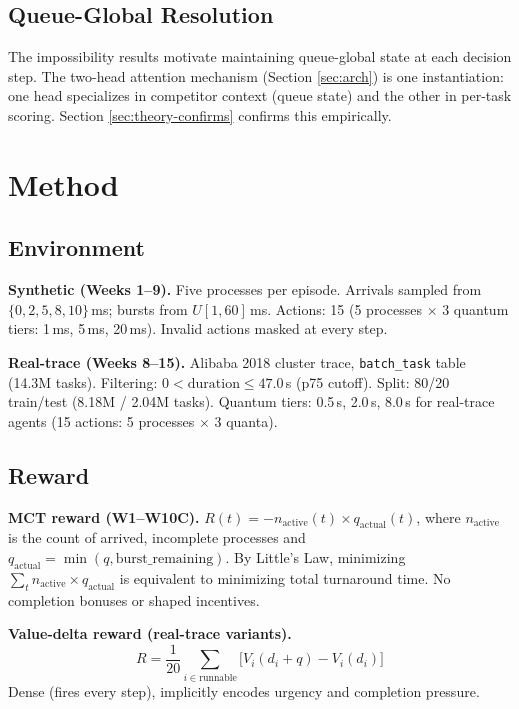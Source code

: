 \documentclass[10pt,twocolumn]{article}
\theoremstyle{remark}
\begin{document}
\subsection{Queue-Global Resolution}

The impossibility results motivate maintaining queue-global state at
each decision step. The two-head attention mechanism (Section
\ref{sec:arch}) is one instantiation: one head specializes in
competitor context (queue state) and the other in per-task scoring.
Section \ref{sec:theory-confirms} confirms this empirically.

\section{Method}
\label{sec:method}

\subsection{Environment}

\textbf{Synthetic (Weeks 1--9).} Five processes per episode. Arrivals
sampled from $\{0,2,5,8,10\}$\,ms; bursts from $U[1,60]$\,ms.
Actions: 15 (5 processes $\times$ 3 quantum tiers: 1\,ms, 5\,ms,
20\,ms). Invalid actions masked at every step.

\textbf{Real-trace (Weeks 8--15).} Alibaba 2018 cluster trace,
\texttt{batch\_task} table (14.3M tasks). Filtering: $0 <
\mathrm{duration} \leq 47.0$\,s (p75 cutoff). Split: 80/20
train/test (8.18M / 2.04M tasks). Quantum tiers: 0.5\,s, 2.0\,s,
8.0\,s for real-trace agents (15 actions: 5 processes $\times$ 3
quanta).

\subsection{Reward}

\textbf{MCT reward (W1--W10C).}
$R(t) = -n_{\mathrm{active}}(t) \times q_{\mathrm{actual}}(t)$,
where $n_{\mathrm{active}}$ is the count of arrived, incomplete
processes and $q_{\mathrm{actual}} = \min(q, \mathrm{burst\_remaining})$.
By Little's Law, minimizing $\sum_t n_{\mathrm{active}} \times
q_{\mathrm{actual}}$ is equivalent to minimizing total turnaround
time. No completion bonuses or shaped incentives.

\textbf{Value-delta reward (real-trace variants).}
\begin{equation}
  R = \frac{1}{20}\sum_{i \in \mathrm{runnable}}
  \bigl[V_i(d_i+q) - V_i(d_i)\bigr]
  \label{eq:vdreward}
\end{equation}
Dense (fires every step), implicitly encodes urgency and completion
pressure.
\end{document}

